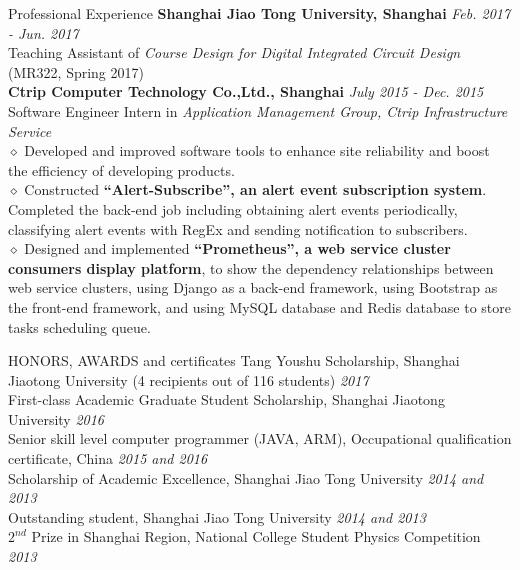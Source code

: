 \documentclass{resume} %
\begin{document}
\begin{rSection}{Professional Experience}
\textbf{Shanghai Jiao Tong University, Shanghai} \hfill \emph{Feb. 2017 - Jun. 2017}
\\Teaching Assistant of \emph{Course Design for Digital Integrated Circuit Design} (MR322, Spring 2017)
\\\textbf{Ctrip Computer Technology Co.,Ltd., Shanghai} \hfill \emph{July 2015 - Dec. 2015}
\\Software Engineer Intern in \emph{Application Management Group, Ctrip Infrastructure Service}
\\$\diamond$ Developed and improved software tools to enhance site reliability and boost the efficiency of developing  products.
\\$\diamond$ Constructed \textbf{``Alert-Subscribe'', an alert event subscription system}. Completed the back-end job including obtaining alert events periodically, classifying alert events with RegEx and sending notification to subscribers.
\\$\diamond$ Designed and implemented \textbf{``Prometheus'', a web service cluster consumers display platform}, to show the dependency relationships between web service clusters, using Django as a back-end framework, using Bootstrap as the front-end framework, and using MySQL database and Redis database to store tasks scheduling queue.
\end{rSection}

\begin{rSection}{HONORS, AWARDS and certificates}
Tang Youshu Scholarship, Shanghai Jiaotong University (4 recipients out of 116 students) \hfill \emph{2017}
\\First-class Academic Graduate Student Scholarship, Shanghai Jiaotong University  \hfill \emph{2016}
\\Senior skill level computer programmer (JAVA, ARM), Occupational qualification certificate, China \hfill \emph{2015 and 2016}
\\Scholarship of Academic Excellence, Shanghai Jiao Tong University \hfill \emph{2014 and 2013}
\\Outstanding student, Shanghai Jiao Tong University \hfill \emph{2014 and 2013}
\\$2^{nd}$ Prize in Shanghai Region, National College Student Physics Competition \hfill \emph{2013}
\end{rSection}





\end{document}
